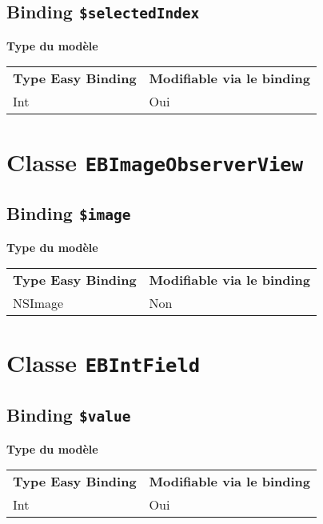\subsection{Binding \texttt{\$selectedIndex}}

{\bf Type du modèle}

\begin{tabular}{ll}
\textbf{Type Easy Binding} & \textbf{Modifiable via le binding}\\
Int& Oui\\
\end{tabular}







\section{Classe \texttt{EBImageObserverView}}

\subsection{Binding \texttt{\$image}}

{\bf Type du modèle}

\begin{tabular}{ll}
\textbf{Type Easy Binding} & \textbf{Modifiable via le binding}\\
NSImage& Non\\
\end{tabular}







\section{Classe \texttt{EBIntField}}

\subsection{Binding \texttt{\$value}}

{\bf Type du modèle}

\begin{tabular}{ll}
\textbf{Type Easy Binding} & \textbf{Modifiable via le binding}\\
Int& Oui\\
\end{tabular}







